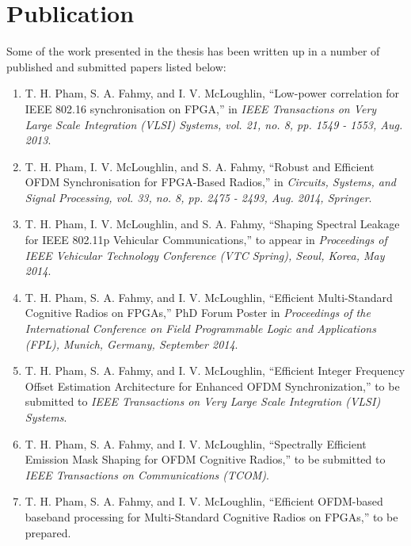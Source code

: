 \section{Publication}
Some of the work presented in the thesis has been written up in a number of published and submitted papers listed below:

\begin{enumerate}

\item  T. H. Pham, S. A. Fahmy, and I. V. McLoughlin, ``Low-power correlation for IEEE 802.16 synchronisation on FPGA,'' in \textit{IEEE Transactions on Very Large Scale Integration (VLSI) Systems, vol. 21, no. 8, pp. 1549 - 1553, Aug. 2013}.

\item T. H. Pham, I. V. McLoughlin, and S. A. Fahmy, ``Robust and Efficient OFDM Synchronisation for FPGA-Based Radios,'' in \textit{Circuits, Systems, and Signal Processing, vol. 33, no. 8, pp. 2475 - 2493, Aug. 2014, Springer}.

\item  T. H. Pham, I. V. McLoughlin, and S. A. Fahmy, ``Shaping Spectral Leakage for IEEE 802.11p Vehicular Communications,'' to appear in \textit{Proceedings of IEEE Vehicular Technology Conference (VTC Spring), Seoul, Korea, May 2014}.

\item T. H. Pham, S. A. Fahmy, and I. V. McLoughlin, ``Efficient Multi-Standard Cognitive Radios on FPGAs,'' PhD Forum Poster in \textit{Proceedings of the International Conference on Field Programmable Logic and Applications (FPL), Munich, Germany, September 2014}.

\item T. H. Pham, S. A. Fahmy, and I. V. McLoughlin, ``Efficient Integer Frequency Offset Estimation Architecture for Enhanced OFDM Synchronization,'' to be submitted to \textit{IEEE Transactions on Very Large Scale Integration (VLSI) Systems}.

\item T. H. Pham, S. A. Fahmy, and I. V. McLoughlin, ``Spectrally Efficient Emission Mask Shaping for OFDM Cognitive Radios,''  to be submitted to \textit{IEEE Transactions on Communications (TCOM)}.

\item T. H. Pham, S. A. Fahmy, and I. V. McLoughlin, ``Efficient OFDM-based baseband processing for Multi-Standard Cognitive Radios on FPGAs,'' to be prepared.

\end{enumerate}
